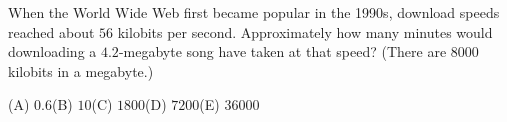 When the World Wide Web first became popular in the 1990s, download speeds reached about $56$ kilobits per second. Approximately how many minutes would downloading a $4.2$-megabyte song have taken at that speed? (There are $8000$ kilobits in a megabyte.)

(A) $0.6$\quad (B) $10$\quad (C) $1800$\quad (D) $7200$\quad (E) $36000$
